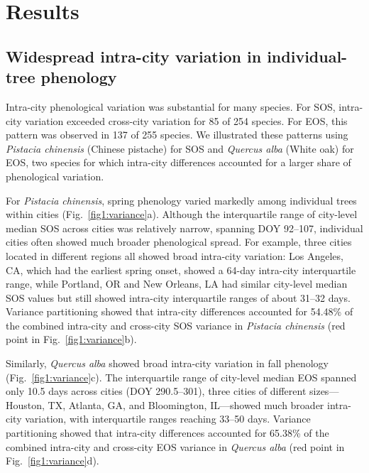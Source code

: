 \section{Results}

\subsection{Widespread intra-city variation in individual-tree phenology}

Intra-city phenological variation was substantial for many species. For SOS, intra-city variation exceeded cross-city variation for 85 of 254 species. For EOS, this pattern was observed in 137 of 255 species. We illustrated these patterns using \textit{Pistacia chinensis} (Chinese pistache) for SOS and \textit{Quercus alba} (White oak) for EOS, two species for which intra-city differences accounted for a larger share of phenological variation. 

For \textit{Pistacia chinensis}, spring phenology varied markedly among individual trees within cities (Fig.~\ref{fig1:variance}a). Although the interquartile range of city-level median SOS across cities was relatively narrow, spanning DOY 92--107, individual cities often showed much broader phenological spread. For example, three cities located in different regions all showed broad intra-city variation: Los Angeles, CA, which had the earliest spring onset, showed a 64-day intra-city interquartile range, while Portland, OR and New Orleans, LA had similar city-level median SOS values but still showed intra-city interquartile ranges of about 31--32 days. Variance partitioning showed that intra-city differences accounted for 54.48\% of the combined intra-city and cross-city SOS variance in \textit{Pistacia chinensis} (red point in Fig.~\ref{fig1:variance}b).

Similarly, \textit{Quercus alba} showed broad intra-city variation in fall phenology (Fig.~\ref{fig1:variance}c). The interquartile range of city-level median EOS spanned only 10.5 days across cities (DOY 290.5--301), three cities of different sizes—Houston, TX, Atlanta, GA, and Bloomington, IL—showed much broader intra-city variation, with interquartile ranges reaching 33--50 days. Variance partitioning showed that intra-city differences accounted for 65.38\% of the combined intra-city and cross-city EOS variance in \textit{Quercus alba} (red point in Fig.~\ref{fig1:variance}d).

